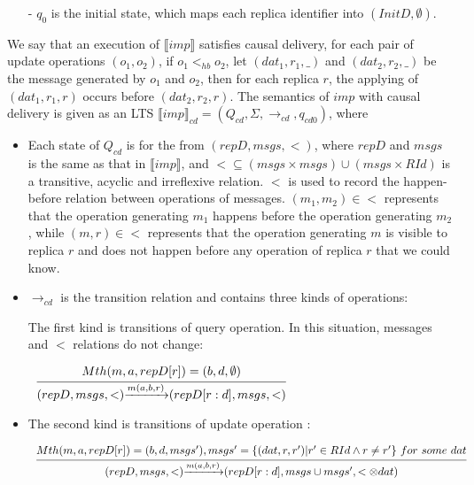 {\begin{itemize}
\item[-] $q_0$ is the initial state, which maps each replica identifier into $(InitD,\emptyset)$.
\end{itemize}

We say that an execution of $\llbracket imp \rrbracket$ satisfies causal delivery, for each pair of update operations $(o_1,o_2)$, if $o_1 <_{hb} o_2$, let $(dat_1,r_1,\_)$ and $(dat_2,r_2,\_)$ be the message generated by $o_1$ and $o_2$, then for each replica $r$, the applying of $(dat_1,r_1,r)$ occurs before $(dat_2,r_2,r)$. The semantics of $imp$ with causal delivery is given as an LTS $\llbracket imp \rrbracket_{cd} = (Q_{cd},\Sigma,\rightarrow_{cd},q_{cd0})$, where

\begin {itemize}
\setlength{\itemsep}{0.5pt}
\item[-] Each state of $Q_{cd}$ is for the from $(repD,msgs,<)$, where $repD$ and $msgs$ is the same as that in $\llbracket imp \rrbracket$, and $< \subseteq (msgs \times msgs) \cup (msgs \times RId)$ is a transitive, acyclic and irreflexive relation. $<$ is used to record the happen-before relation between operations of messages. %
    $(m_1,m_2) \in <$ represents that the operation generating $m_1$ happens before the operation generating $m_2$, while $(m,r) \in <$ represents that the operation generating $m$ is visible to replica $r$ and does not happen before any operation of replica $r$ that we could know.

\item[-] $\rightarrow_{cd}$ is the transition relation and contains three kinds of operations:

    The first kind is transitions of query operation. In this situation, messages and $<$ relations do not change:

    $\begin{array}{l c} \bigfrac{ Mth(m,a,repD[r]) = (b,d,\emptyset)} {(repD,msgs,<) {\xrightarrow{m(a,b,r)}} (repD[r:d],msgs,<)} \end{array}$



\item[-] The second kind is transitions of update operation :

    $\begin{array}{l c} \bigfrac{ Mth(m,a,repD[r]) = (b,d,msgs'), msgs' = \{ (dat,r,r') \vert r' \in RId \wedge r \neq r' \} \ for \ some \ dat} {(repD,msgs,<) {\xrightarrow{m(a,b,r)}} (repD[r:d],msgs \cup msgs',< \otimes dat)} \end{array}$


\end{itemize}}
